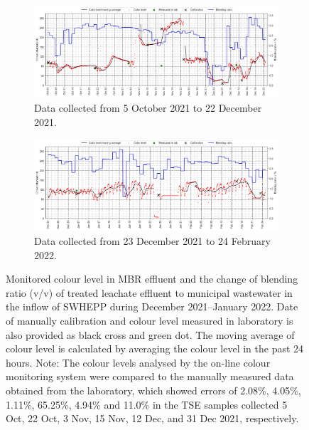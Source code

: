 \begin{figure}[!h]
    \centering
    \begin{subfigure}[t]{1.0\textwidth}
      \includegraphics[width=\linewidth]{imgs/leachate-effluent-blend-ratio-color-plot/first-80d.png}
      \caption{Data collected from 5 October 2021 to 22 December 2021.} \label{fig:data-oct}
    \end{subfigure}%
    \hspace{2em}%
    \begin{subfigure}[t]{1.0\textwidth}
      \includegraphics[width=\linewidth]{imgs/leachate-effluent-blend-ratio-color-plot/second-80d.png}
      \caption{Data collected from 23 December 2021 to 24 February 2022.} \label{fig:data-nov}
    \end{subfigure}%
  \caption{Monitored colour level in MBR effluent and the change of blending ratio (v/v) of treated leachate effluent to municipal wastewater in the inflow of SWHEPP during December 2021–January 2022. Date of manually calibration and colour level measured in laboratory is also provided as black cross and green dot. The moving average of colour level is calculated by averaging the colour level in the past 24 hours. Note: The colour levels analysed by the on-line colour monitoring system were compared to the manually measured data obtained from the laboratory, which showed errors of 2.08\%, 4.05\%, 1.11\%, 65.25\%, 4.94\% and 11.0\% in the TSE samples collected 5 Oct, 22 Oct, 3 Nov, 15 Nov, 12 Dec, and 31 Dec 2021, respectively.} \label{fig:nh3-data}
\end{figure}

